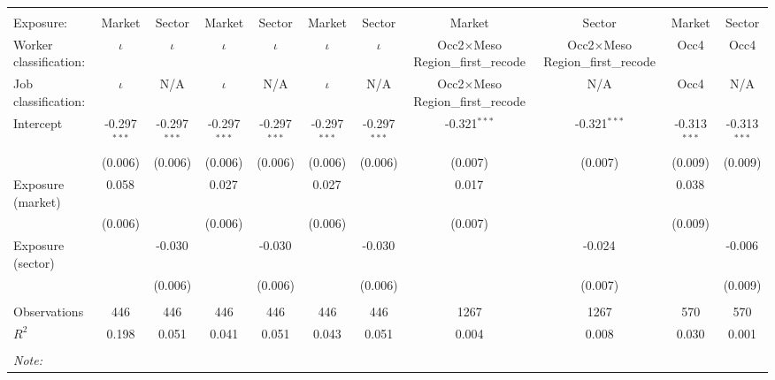 \begin{tabular}{@{\extracolsep{5pt}}lcccccccccc}
\\[-1.8ex]\hline
\hline \\[-1.8ex]
\hline \\[-1.8ex]
 Exposure: & Market & Sector & Market & Sector & Market & Sector & Market & Sector & Market & Sector \\
 Worker classification: & $\iota$ & $\iota$ & $\iota$ & $\iota$ & $\iota$ & $\iota$ & Occ2$\times$Meso Region_first_recode & Occ2$\times$Meso Region_first_recode & Occ4 & Occ4 \\
 Job classification: & $\iota$ & N/A & $\iota$ & N/A & $\iota$ & N/A & Occ2$\times$Meso Region_first_recode & N/A & Occ4 & N/A \\
 Intercept & -0.297$^{***}$ & -0.297$^{***}$ & -0.297$^{***}$ & -0.297$^{***}$ & -0.297$^{***}$ & -0.297$^{***}$ & -0.321$^{***}$ & -0.321$^{***}$ & -0.313$^{***}$ & -0.313$^{***}$ \\
& (0.006) & (0.006) & (0.006) & (0.006) & (0.006) & (0.006) & (0.007) & (0.007) & (0.009) & (0.009) \\
 Exposure (market) & 0.058$^{}$ & & 0.027$^{}$ & & 0.027$^{}$ & & 0.017$^{}$ & & 0.038$^{}$ & \\
& (0.006) & & (0.006) & & (0.006) & & (0.007) & & (0.009) & \\
 Exposure (sector) & & -0.030$^{}$ & & -0.030$^{}$ & & -0.030$^{}$ & & -0.024$^{}$ & & -0.006$^{}$ \\
& & (0.006) & & (0.006) & & (0.006) & & (0.007) & & (0.009) \\
\hline \\[-1.8ex]
 Observations & 446 & 446 & 446 & 446 & 446 & 446 & 1267 & 1267 & 570 & 570 \\
 $R^2$ & 0.198 & 0.051 & 0.041 & 0.051 & 0.043 & 0.051 & 0.004 & 0.008 & 0.030 & 0.001 \\
\hline
\hline \\[-1.8ex]
\textit{Note:}\end{tabular}
